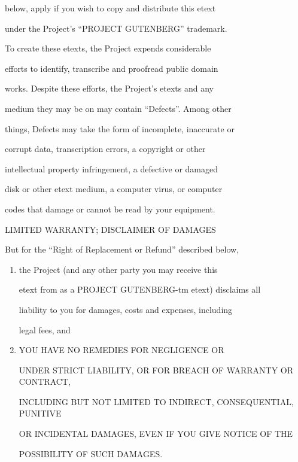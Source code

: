 \documentclass[12pt]{book}
\begin{document}
below, apply if you wish to copy and distribute this etext

under the Project's ``PROJECT GUTENBERG'' trademark.



To create these etexts, the Project expends considerable

efforts to identify, transcribe and proofread public domain

works.  Despite these efforts, the Project's etexts and any

medium they may be on may contain ``Defects''.  Among other

things, Defects may take the form of incomplete, inaccurate or

corrupt data, transcription errors, a copyright or other

intellectual property infringement, a defective or damaged

disk or other etext medium, a computer virus, or computer

codes that damage or cannot be read by your equipment.



\begin{center}

LIMITED WARRANTY; DISCLAIMER OF DAMAGES

\end{center}



But for the ``Right of Replacement or Refund'' described below,

\begin{enumerate}

\item the Project (and any other party you may receive this

etext from as a PROJECT GUTENBERG-tm etext) disclaims all

liability to you for damages, costs and expenses, including

legal fees, and

\item YOU HAVE NO REMEDIES FOR NEGLIGENCE OR

UNDER STRICT LIABILITY, OR FOR BREACH OF WARRANTY OR CONTRACT,

INCLUDING BUT NOT LIMITED TO INDIRECT, CONSEQUENTIAL, PUNITIVE

OR INCIDENTAL DAMAGES, EVEN IF YOU GIVE NOTICE OF THE

POSSIBILITY OF SUCH DAMAGES.

\end{enumerate}
\end{document}
